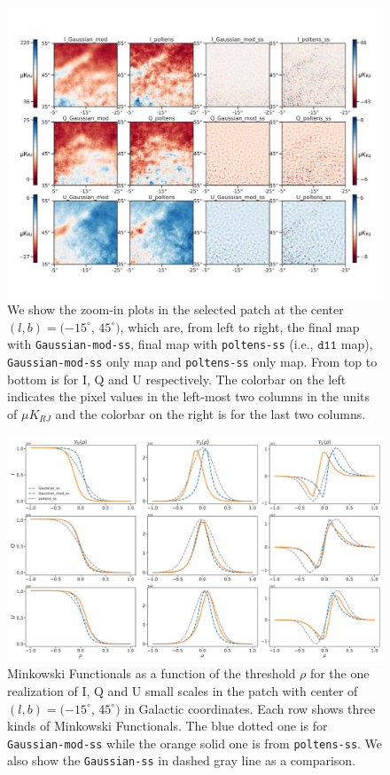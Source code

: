 \documentclass[twocolumn]{aastex631}
\begin{document}
\begin{figure}
    \centering
    \includegraphics[width=180mm]{figures/maps_patch_345_45.pdf}
    \caption{We show the zoom-in plots in the selected patch at the center $(l, b) = (-15^{\circ}$, $45^{\circ})$, which are, from left to right, the final map with \texttt{Gaussian-mod-ss}, final map with \texttt{poltens-ss} (i.e., $\texttt{d11}$ map), \texttt{Gaussian-mod-ss} only map and \texttt{poltens-ss} only map. From top to bottom is for I, Q and U respectively. The colorbar on the left indicates the pixel values in the left-most two columns in the units of $\mu K_{RJ}$ and the colorbar on the right is for the last two columns. }
    \label{fig:maps:patch2}
\end{figure}

\begin{figure}
    \centering
    \includegraphics[width=180mm]{figures/MFs_345_45_with_G_rescaled.pdf}
    \caption{Minkowski Functionals as a function of the threshold $\rho$ for the one realization of I, Q and U small scales in the patch with center of $(l, b) = (-15^{\circ}$, $45^{\circ})$ in Galactic coordinates. Each row shows three kinds of Minkowski Functionals. The blue dotted one is for \texttt{Gaussian-mod-ss} while the orange solid one is from \texttt{poltens-ss}. We also show the \texttt{Gaussian-ss} in dashed gray line as a comparison.}
    \label{fig:MF:patch2}
\end{figure}
\end{document}
